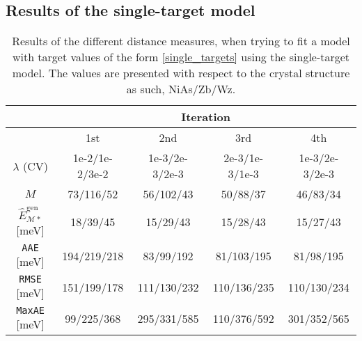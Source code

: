 \subsection{Results of the single-target model}\label{sec:single_results}

\begin{table}
\centering
\begin{tabular}{c|cccc}

\toprule
 & \multicolumn{4}{c}{\textbf{Iteration}} \\
\hline
     & 1st & 2nd & 3rd & 4th  \\
   
   \midrule
   \hline
     $\lambda$ (CV) & 1e-2/1e-2/3e-2 & 1e-3/2e-3/2e-3 & 2e-3/1e-3/1e-3 & 1e-3/2e-3/2e-3\\
   $M$  & 73/116/52 & 56/102/43 & 50/88/37 &  46/83/34 \\
   $\hat{E}_{\mathcal{M}*}^{\mathrm{gen}}$ [meV] & 18/39/45 & 15/29/43 & 15/28/43 & 15/27/43 \\
   \texttt{AAE} [meV] & 194/219/218 & 83/99/192 & 81/103/195 & 81/98/195         \\
   \texttt{RMSE} [meV] & 151/199/178 & 111/130/232 & 110/136/235 & 110/130/234        \\
   \texttt{MaxAE} [meV] & 99/225/368 & 295/331/585 & 110/376/592 & 301/352/565        \\
\hline
\bottomrule
\end{tabular}
\caption[Table of the different statistical measures calculated for the single-target model]{Results of the different distance measures, when trying to fit a model with target values of the form \eqref{single_targets} using the single-target model. The values are presented with respect to the crystal structure as such, NiAs/Zb/Wz.}
\label{tab:results_single}
\end{table}

